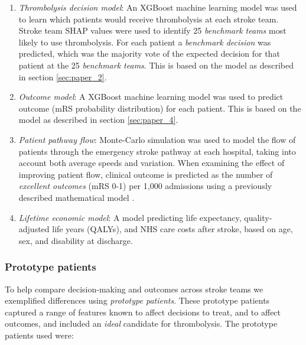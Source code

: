 \begin{enumerate}

    \item \textit{Thrombolysis decision model}: An XGBoost machine learning model \cite{chen_xgboost_2016} was used to learn which patients would receive thrombolysis at each stroke team. Stroke team SHAP values were used to identify 25 \textit{benchmark teams} most likely to use thrombolysis. For each patient a \textit{benchmark decision} was predicted, which was the majority vote of the expected decision for that patient at the 25 \textit{benchmark teams}. This is based on the model as described in section \ref{sec:paper_2}.

    \item \textit{Outcome model}: A XGBoost machine learning model was used to predict outcome (mRS probability distribution) for each patient. This is based on the model as described in section \ref{sec:paper_4}.

    \item \textit{Patient pathway flow}: Monte-Carlo simulation was used to model the flow of patients through the emergency stroke pathway at each hospital, taking into account both average speeds and variation. When examining the effect of improving patient flow, clinical outcome is predicted as the number of \textit{excellent outcomes} (mRS 0-1) per 1,000 admissions using a previously described mathematical model \cite{allen_estimation_2020}.

    \item \textit{Lifetime economic model}: A model predicting life expectancy, quality-adjusted life years (QALYs), and NHS care costs after stroke, based on age, sex, and disability at discharge\cite{mcmeekin_lifetime_2024}.
    
\end{enumerate}

\subsubsection{Prototype patients}

To help compare decision-making and outcomes across stroke teams we exemplified differences using \textit{prototype patients}. These prototype patients captured a range of features known to affect decisions to treat, and to affect outcomes, and included an \textit{ideal} candidate for thrombolysis. The prototype patients used were:

